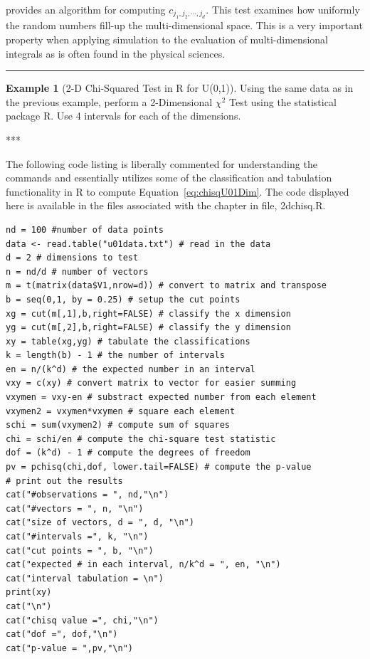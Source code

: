 \documentclass[
]{book}
\theoremstyle{definition}
\theoremstyle{definition}
\newtheorem{example}{Example}[chapter]
\theoremstyle{definition}
\theoremstyle{definition}
\theoremstyle{remark}
\begin{document}
\citep{law2007simulation} provides an algorithm for computing
\(c_{j_{1}, j_{2}, \cdots, j_{d}}\). This test examines how uniformly the random numbers
fill-up the multi-dimensional space. This is a very important property
when applying simulation to the evaluation of multi-dimensional
integrals as is often found in the physical sciences.

\begin{center}\rule{0.5\linewidth}{0.5pt}\end{center}

\begin{example}[2-D Chi-Squared Test in R for U(0,1)]
\protect\hypertarget{exm:TestU012D}{}{\label{exm:TestU012D} {} }Using the same data as in the previous example, perform a 2-Dimensional \(\chi^{2}\) Test using the
statistical package R. Use 4 intervals for each of the dimensions.
\end{example}
***

The following code listing is liberally commented for understanding the
commands and essentially utilizes some of the classification and
tabulation functionality in R to compute
Equation~\eqref{eq:chisqU01Dim}. The code displayed here is available in the files associated with the chapter in file, 2dchisq.R.

\begin{verbatim}
nd = 100 #number of data points
data <- read.table("u01data.txt") # read in the data
d = 2 # dimensions to test
n = nd/d # number of vectors
m = t(matrix(data$V1,nrow=d)) # convert to matrix and transpose
b = seq(0,1, by = 0.25) # setup the cut points
xg = cut(m[,1],b,right=FALSE) # classify the x dimension
yg = cut(m[,2],b,right=FALSE) # classify the y dimension
xy = table(xg,yg) # tabulate the classifications
k = length(b) - 1 # the number of intervals
en = n/(k^d) # the expected number in an interval
vxy = c(xy) # convert matrix to vector for easier summing
vxymen = vxy-en # substract expected number from each element
vxymen2 = vxymen*vxymen # square each element
schi = sum(vxymen2) # compute sum of squares
chi = schi/en # compute the chi-square test statistic
dof = (k^d) - 1 # compute the degrees of freedom
pv = pchisq(chi,dof, lower.tail=FALSE) # compute the p-value
# print out the results
cat("#observations = ", nd,"\n")
cat("#vectors = ", n, "\n")
cat("size of vectors, d = ", d, "\n")
cat("#intervals =", k, "\n")
cat("cut points = ", b, "\n")
cat("expected # in each interval, n/k^d = ", en, "\n")
cat("interval tabulation = \n")
print(xy)
cat("\n")
cat("chisq value =", chi,"\n")
cat("dof =", dof,"\n")
cat("p-value = ",pv,"\n") 
\end{verbatim}
\end{document}
